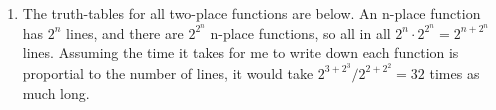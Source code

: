 \documentclass[a4paper,12pt]{article}
\begin{document}
\begin{enumerate}[label=\thesubsection.\arabic*.]
        \item The truth-tables for all two-place functions are below. An n-place function has $2^n$ lines, and there are $2^{2^n}$ n-place functions, so all in all $2^n \cdot 2^{2^n} = 2^{n + 2^n}$ lines. Assuming the time it takes for me to write down each function is proportial to the number of lines, it would take $2^{3 + 2^3} / 2^{2 + 2^2} = 32$ times as much long.
\end{enumerate}
\end{document}
